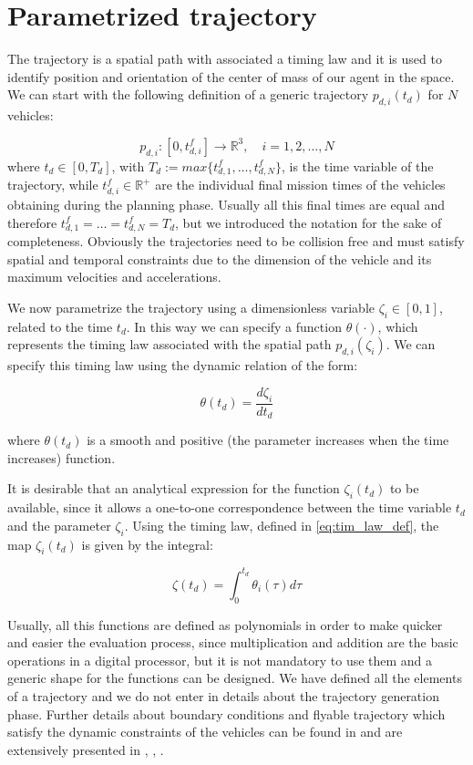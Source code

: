\section{Parametrized trajectory\label{sec:parametrized_trajectory}}
The trajectory is a spatial path with associated a timing law and it is used
to identify position and orientation of the center of mass of our agent in the space.
We can start with the following definition of a generic trajectory $ p_{d,i}(t_d) $
for $ N $ vehicles:

\begin{equation}  \label{eq:traj_def}
  p_{d,i}:[0,t^f_{d,i}] \rightarrow \mathbb{R}^3, \quad i = 1,2,\dots,N
\end{equation}
where $ t_d \in [0, T_d] $, with $T_d := max \{ t^f_{d,1}, \dots , t^f_{d,N} \} $,
is the time variable of the trajectory, while $ t^f_{d,i} \in \mathbb{R}^+ $
are the individual final mission times of the vehicles obtaining during the planning
phase. Usually all this final times are equal and therefore
$ t^f_{d,1} = \dots = t^f_{d,N} = T_d$, but we introduced the notation
for the sake of completeness.
Obviously the trajectories need to be collision free and must satisfy spatial
and temporal constraints due to the dimension of the vehicle and its maximum
velocities and accelerations.

We now parametrize the trajectory using a dimensionless variable $ \zeta_i \in [0,1]$,
related to the time $t_d$. In this way we can specify a function $ \theta( \cdot )$,
which represents the timing law associated with the spatial path $p_{d,i}(\zeta_i)$.
We can specify this timing law using the dynamic relation of the form:

\begin{equation}  \label{eq:tim_law_def}
  \theta( t_d ) = \frac{d \zeta_i}{dt_d}
\end{equation}

where $ \theta( t_d ) $ is a smooth and positive (the parameter increases when
the time increases) function.

It is desirable that an analytical expression for the function $ \zeta_i (t_d) $
to be available, since it allows a one-to-one correspondence between the time
variable $t_d$ and the parameter $ \zeta_i $.
Using the timing law, defined in \eqref{eq:tim_law_def}, the map $ \zeta_i ( t_d) $
is given by the integral:

\begin{equation}  \label{eq:zeta_law_def}
  \zeta( t_d ) = \int^{t_d}_0 \theta_i(\tau) d \tau
\end{equation}

Usually, all this functions are defined as polynomials in order to make quicker and
easier the evaluation process, since multiplication and addition are the basic
operations in a digital processor, but it is not mandatory to use them and a
generic shape for the functions can be designed.
We have defined all the elements of a trajectory and we do not enter in details
about the trajectory generation phase.
Further details about boundary conditions and flyable trajectory which satisfy
the dynamic constraints of the vehicles can be found in \cite{cichellaMain} and
are extensively presented in \cite{trajGeneration1}, \cite{trajGeneration2},
\cite{trajGeneration3}.
